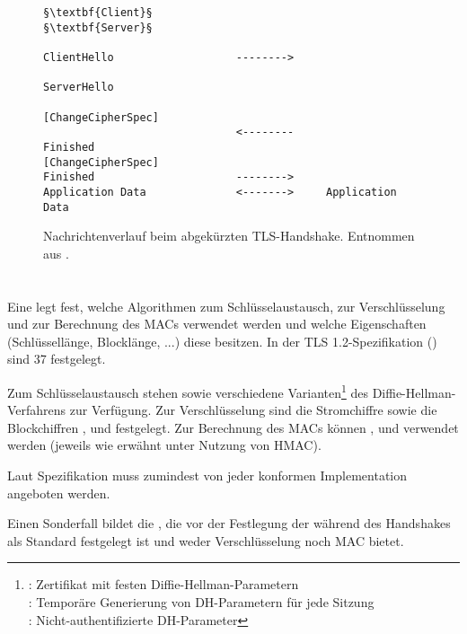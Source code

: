 \lstset{
	style=default,
	frame=single
}
\begin{figure}[H]
	\centering
	\begin{lstlisting}
§\textbf{Client}§                                                §\textbf{Server}§

ClientHello                   -------->
                                                 ServerHello
                                          [ChangeCipherSpec]
                              <--------             Finished
[ChangeCipherSpec]
Finished                      -------->
Application Data              <------->     Application Data
	\end{lstlisting}
	\caption{Nachrichtenverlauf beim abgekürzten TLS-Handshake. Entnommen aus \cite{tls12}.}
	\label{fig_abbreviated_handshake}
\end{figure}
\lstset{style=tls}


\section{\ciphersuites{}}
\label{sec_cipher_suites}

Eine \ciphersuite{} legt fest, welche Algorithmen zum Schlüsselaustausch, zur Verschlüsselung und zur Berechnung des MACs verwendet werden und welche Eigenschaften (Schlüssellänge, Blocklänge, ...) diese besitzen. In der TLS 1.2-Spezifikation (\cite{tls12}) sind 37 \ciphersuites{} festgelegt.

Zum Schlüsselaustausch stehen  sowie verschiedene Varianten\footnote{
	: Zertifikat mit festen Diffie-Hellman-Parametern\\ 
	: Temporäre Generierung von DH-Parametern für jede Sitzung \\
	:  Nicht-authentifizierte DH-Parameter
} des Diffie-Hellman-Verfahrens zur Verfügung. 
Zur Verschlüsselung sind die Stromchiffre  sowie die Blockchiffren ,  und  festgelegt. 
Zur Berechnung des MACs können ,  und  verwendet werden (jeweils wie erwähnt unter Nutzung von HMAC).

Laut Spezifikation muss zumindest  von jeder konformen Implementation angeboten werden.

Einen Sonderfall bildet die \ciphersuite{} , die vor der Festlegung der \ciphersuite{} während des Handshakes als Standard festgelegt ist und weder Verschlüsselung noch MAC bietet.


